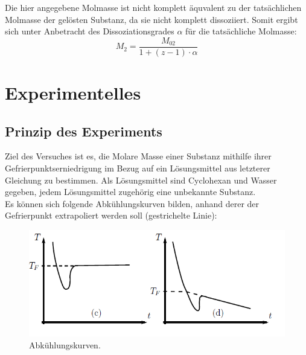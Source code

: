 \documentclass[12pt,a4paper,titlepage,headinclude,bibtotoc]{scrartcl}
\begin{document}

Die hier angegebene Molmasse ist nicht komplett äquvalent zu der tatsächlichen Molmasse der gelösten Substanz, da sie nicht komplett dissoziiert. Somit ergibt sich unter Anbetracht des Dissoziationsgrades $\alpha$ für die tatsächliche Molmasse: \\

\begin{equation}
M_2 = \frac{M_\mathrm{02}}{1+(z-1) \cdot \alpha}
\end{equation}

\section{Experimentelles}
\subsection{Prinzip des Experiments}

Ziel des Versuches ist es, die Molare Masse einer Substanz mithilfe ihrer Gefrierpunktserniedrigung im Bezug auf ein Lösungsmittel aus letzterer Gleichung zu bestimmen. Als Lösungsmittel sind Cyclohexan und Wasser gegeben, jedem Lösungsmittel zugehörig eine unbekannte Substanz.\\
Es können sich folgende Abkühlungskurven bilden, anhand derer der Gefrierpunkt extrapoliert werden soll (gestrichelte Linie): 

\begin{figure} [h!]
\begin{center}
\includegraphics[scale=0.8]{Abkuhlungskurven.png} \end{center}
\caption {Abkühlungskurven. \protect\footnotemark}
\end{figure}
\end{document}
